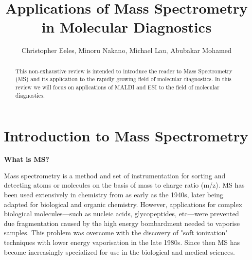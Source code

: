 \documentclass[letterpaper, 10 pt, conference]{ieeeconf}  %
\title{\LARGE \bf
Applications of Mass Spectrometry in Molecular Diagnostics
}
\author{Christopher Eeles, Minoru Nakano, Michael Lau, Abubakar Mohamed %
}
\begin{document}
\maketitle
\thispagestyle{empty}
\pagestyle{empty}

\setcounter{secnumdepth}{3}
\setcounter{tocdepth}{3}
\tableofcontents %


\twocolumn

\begin{abstract}

This non-exhaustive review is intended to introduce the reader to Mass Spectrometry (MS) and its application to the rapidly growing field of molecular diagnostics. In this review we will focus on applications of MALDI and ESI to the field of molecular diagnostics.

\end{abstract}

\section{\textbf{Introduction to Mass Spectrometry}}

    \textbf{What is MS?}\hfill
    \vspace{5 pt}

    Mass spectrometry is a method and set of instrumentation for sorting and detecting atoms or molecules on the basis of mass to charge ratio (m/z)\autocite{R7}. MS has been used extensively in chemistry from as early as the 1940s, later being adapted for biological and organic chemistry.\autocite{R7} However, applications for complex biological molecules---such as nucleic acids, glycopeptides, etc---were prevented due fragmentation caused by the high energy bombardment needed to vaporise samples. This problem was overcome with the discovery of "soft ionization" techniques with lower energy vaporisation in the late 1980s. Since then MS has become increasingly specialized for use in the biological and medical sciences.\autocite{R7} 
\end{document}
